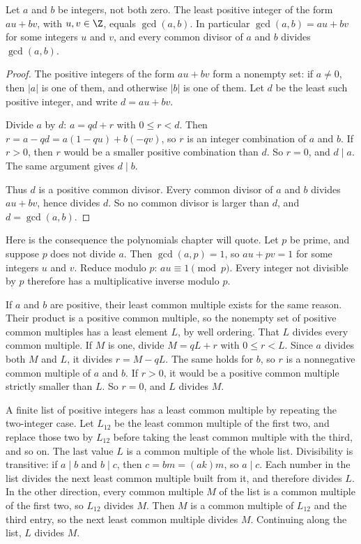 \begin{propositionx}
Let $a$ and $b$ be integers, not both zero. The least positive integer of the form $au+bv$, with $u,v\in\Z$, equals $\gcd(a,b)$. In particular $\gcd(a,b)=au+bv$ for some integers $u$ and $v$, and every common divisor of $a$ and $b$ divides $\gcd(a,b)$.
\end{propositionx}
\begin{proof}
The positive integers of the form $au+bv$ form a nonempty set: if $a\ne0$, then $|a|$ is one of them, and otherwise $|b|$ is one of them. Let $d$ be the least such positive integer, and write $d=au+bv$.

Divide $a$ by $d$: $a=qd+r$ with $0\le r<d$. Then $r=a-qd=a(1-qu)+b(-qv)$, so $r$ is an integer combination of $a$ and $b$. If $r>0$, then $r$ would be a smaller positive combination than $d$. So $r=0$, and $d\mid a$. The same argument gives $d\mid b$.

Thus $d$ is a positive common divisor. Every common divisor of $a$ and $b$ divides $au+bv$, hence divides $d$. So no common divisor is larger than $d$, and $d=\gcd(a,b)$.
\end{proof}

Here is the consequence the polynomials chapter will quote. Let $p$ be prime, and suppose $p$ does not divide $a$. Then $\gcd(a,p)=1$, so $au+pv=1$ for some integers $u$ and $v$. Reduce modulo $p$: $au\equiv1\pmod p$. Every integer not divisible by $p$ therefore has a multiplicative inverse modulo $p$.

If $a$ and $b$ are positive, their least common multiple exists for the same reason. Their product is a positive common multiple, so the nonempty set of positive common multiples has a least element $L$, by well ordering. That $L$ divides every common multiple. If $M$ is one, divide $M=qL+r$ with $0\le r<L$. Since $a$ divides both $M$ and $L$, it divides $r=M-qL$. The same holds for $b$, so $r$ is a nonnegative common multiple of $a$ and $b$. If $r>0$, it would be a positive common multiple strictly smaller than $L$. So $r=0$, and $L$ divides $M$.

A finite list of positive integers has a least common multiple by repeating the two-integer case. Let $L_{12}$ be the least common multiple of the first two, and replace those two by $L_{12}$ before taking the least common multiple with the third, and so on. The last value $L$ is a common multiple of the whole list. Divisibility is transitive: if $a\mid b$ and $b\mid c$, then $c=bm=(ak)m$, so $a\mid c$. Each number in the list divides the next least common multiple built from it, and therefore divides $L$. In the other direction, every common multiple $M$ of the list is a common multiple of the first two, so $L_{12}$ divides $M$. Then $M$ is a common multiple of $L_{12}$ and the third entry, so the next least common multiple divides $M$. Continuing along the list, $L$ divides $M$.

